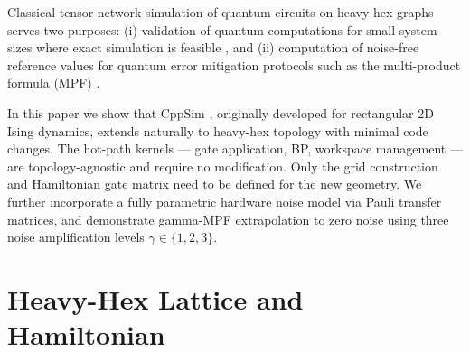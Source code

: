\documentclass[12pt]{article}
\begin{document}
Classical tensor network simulation of quantum circuits on heavy-hex graphs
serves two purposes: (i) validation of quantum computations for small system sizes
where exact simulation is feasible
\cite{tindall2023gauging,tindall2024eagle,tindall2025disordered,rudolph2025simulating},
and (ii) computation of noise-free reference values for quantum error mitigation
protocols such as the multi-product formula (MPF) \cite{mpf-ref}.

In this paper we show that CppSim \cite{dalberto2026cppsim}, originally developed for
rectangular 2D Ising dynamics, extends naturally to heavy-hex topology with
minimal code changes. The hot-path kernels — gate application, BP,
workspace management — are topology-agnostic and require no modification.
Only the grid construction and Hamiltonian gate matrix need to be defined
for the new geometry. We further incorporate a fully parametric hardware noise
model via Pauli transfer matrices, and demonstrate gamma-MPF extrapolation
to zero noise using three noise amplification levels $\gamma \in \{1, 2, 3\}$.

\section{Heavy-Hex Lattice and Hamiltonian}
\label{sec:grid}
\end{document}
